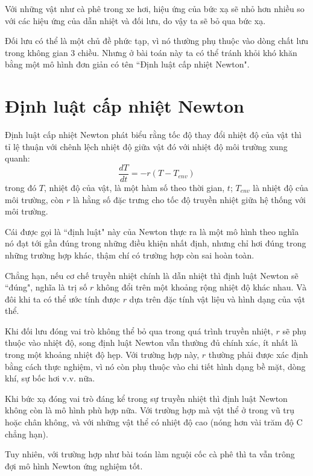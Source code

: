 \documentclass[12pt, openany]{book}
\theoremstyle{exercise}
\begin{document}
Với những vật như cà phê trong xe hơi, hiệu ứng của bức xạ sẽ nhỏ hơn nhiều so với các hiệu ứng của dẫn nhiệt và đối lưu, do vậy ta sẽ bỏ qua bức xạ.

Đối lưu có thể là một chủ đề phức tạp, vì nó thường phụ thuộc vào dòng chất lưu trong không gian 3 chiều. Nhưng ở bài toán này ta có thể tránh khỏi khó khăn bằng một mô hình đơn giản có tên ``Định luật cấp nhiệt Newton".


\section{Định luật cấp nhiệt Newton}

Định luật cấp nhiệt Newton phát biểu rằng tốc độ thay đổi nhiệt độ của vật thì tỉ lệ thuận với chênh lệch nhiệt độ giữa vật đó với nhiệt độ môi trường xung quanh:
%
\[ \frac{dT}{dt} = -r (T - T_{env}) \]
%
trong đó $T$, nhiệt độ của vật, là một hàm số theo thời gian, $t$; $T_{env}$ là nhiệt độ của môi trường, còn $r$ là hằng số đặc trưng cho tốc độ truyền nhiệt giữa hệ thống với môi trường.

Cái được gọi là ``định luật" này của Newton thực ra là một mô hình theo nghĩa nó đạt tới gần đúng trong những điều khiện nhất định, nhưng chỉ hơi đúng trong những trường hợp khác, thậm chí có trường hợp còn sai hoàn toàn.

Chẳng hạn, nếu cơ chế truyền nhiệt chính là dẫn nhiệt thì định luật Newton sẽ ``đúng", nghĩa là trị số $r$ không đổi trên một khoảng rộng nhiệt độ khác nhau. Và đôi khi ta có thể ước tính được $r$ dựa trên đặc tính vật liệu và hình dạng của vật thể.

Khi đối lưu đóng vai trò không thể bỏ qua trong quá trình truyền nhiệt, $r$ sẽ phụ thuộc vào nhiệt độ, song định luật Newton vẫn thường đủ chính xác, ít nhất là trong một khoảng nhiệt độ hẹp. Với trường hợp này, $r$ thường phải được xác định bằng cách thực nghiệm, vì nó còn phụ thuộc vào chi tiết hình dạng bề mặt, dòng khí, sự bốc hơi v.v. nữa.

Khi bức xạ đóng vai trò đáng kể trong sự truyền nhiệt thì định luật Newton không còn là mô hình phù hợp nữa. Với trường hợp mà vật thể ở trong vũ trụ hoặc chân không, và với những vật thể có nhiệt độ cao (nóng hơn vài trăm độ C chẳng hạn).


Tuy nhiên, với trường hợp như bài toán làm nguội cốc cà phê thì ta vẫn trông đợi mô hình Newton ứng nghiệm tốt.
\end{document}
